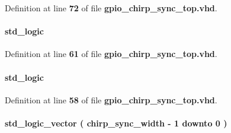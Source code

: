 Definition at line {\bf 72} of file {\bf gpio\+\_\+chirp\+\_\+sync\+\_\+top.\+vhd}.

\paragraph[{mimo\+\_\+en\+\_\+sync}]{ {\bfseries \textcolor{comment}{std\+\_\+logic}\textcolor{vhdlchar}{ }} \hspace{0.3cm}{\ttfamily [Signal]}}\label{classgpio__chirp__sync__top_1_1arch_aa515c40f92444715feddfad89cb2e03d}


Definition at line {\bf 61} of file {\bf gpio\+\_\+chirp\+\_\+sync\+\_\+top.\+vhd}.

\paragraph[{mode\+\_\+sync}]{ {\bfseries \textcolor{comment}{std\+\_\+logic}\textcolor{vhdlchar}{ }} \hspace{0.3cm}{\ttfamily [Signal]}}\label{classgpio__chirp__sync__top_1_1arch_a3bbd5b96a1be40a6267c8e987129aee7}


Definition at line {\bf 58} of file {\bf gpio\+\_\+chirp\+\_\+sync\+\_\+top.\+vhd}.

\paragraph[{q\+\_\+hold}]{ {\bfseries \textcolor{comment}{std\+\_\+logic\+\_\+vector}\textcolor{vhdlchar}{ }\textcolor{vhdlchar}{(}\textcolor{vhdlchar}{ }\textcolor{vhdlchar}{ }\textcolor{vhdlchar}{ }\textcolor{vhdlchar}{ }{\bfseries {\bf chirp\+\_\+sync\+\_\+width}} \textcolor{vhdlchar}{-\/}\textcolor{vhdlchar}{ } \textcolor{vhdldigit}{1} \textcolor{vhdlchar}{ }\textcolor{keywordflow}{downto}\textcolor{vhdlchar}{ }\textcolor{vhdlchar}{ } \textcolor{vhdldigit}{0} \textcolor{vhdlchar}{ }\textcolor{vhdlchar}{)}\textcolor{vhdlchar}{ }} \hspace{0.3cm}{\ttfamily [Signal]}}\label{classgpio__chirp__sync__top_1_1arch_a54e72aab78c3a4795eed950398bfe297}


